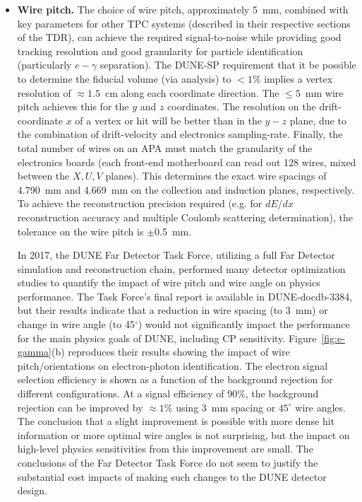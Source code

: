 \begin{itemize}
\item \textbf{Wire pitch.} The choice of wire pitch, approximately \SI{5}{mm}, combined with key parameters for other TPC systems (described in their respective sections of the TDR), can achieve the required signal-to-noise while providing good tracking resolution and good granularity for particle identification (particularly $e-\gamma$ separation). The DUNE-SP requirement that it be possible to determine the fiducial volume (via analysis) to $< 1\%$ implies a vertex resolution of $\approx 1.5$~cm along each coordinate direction. The $\leq 5$~mm wire pitch achieves this for the $y$ and $z$ coordinates.  The resolution on the drift-coordinate $x$ of a vertex or hit will be better than in the $y-z$ plane, due to the combination of drift-velocity and electronics sampling-rate.  Finally, the total number of wires on an APA must match the granularity of the electronics boards (each front-end motherboard can read out 128 wires, mixed between the $X,U,V$ planes). This determines the exact wire spacings of \SI{4.790}{mm} and \SI{4.669}{mm} on the collection and induction planes, respectively.  To achieve the reconstruction precision required (e.g. for $dE/dx$ reconstruction accuracy and multiple Coulomb scattering determination), the tolerance on the wire pitch is $\pm$\SI{0.5}{mm}.

In 2017, the DUNE Far Detector Task Force, utilizing a full Far Detector simulation and reconstruction chain, performed many detector optimization studies to quantify the impact of wire pitch and wire angle on physics performance.  The Task Force's final report is available in DUNE-docdb-3384, but their results indicate that a reduction in wire spacing (to \SI{3}{mm}) or change in wire angle (to 45$^\circ$) would not significantly impact the performance for the main physics goals of DUNE, including CP sensitivity.  Figure~\ref{fig:e-gamma}(b) reproduces their results showing the impact of wire pitch/orientations on electron-photon identification. The electron signal selection efficiency is shown as a function of the background rejection for different configurations. At a signal efficiency of $90\%$, the background rejection can be improved by $\approx 1\%$ using \SI{3}{mm} spacing or $45^\circ$ wire angles.  The conclusion that a slight improvement is possible with more dense hit information or more optimal wire angles is not surprising, but the impact on high-level physics sensitivities from this improvement are small. The conclusions of the Far Detector Task Force do not seem to justify the substantial cost impacts of making such changes to the DUNE detector design.        


\end{itemize}
